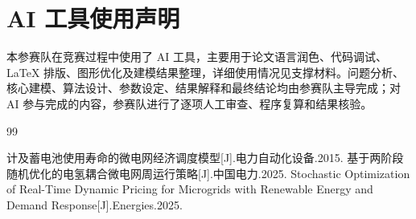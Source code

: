 %
%

\section*{AI 工具使用声明}

本参赛队在竞赛过程中使用了 AI 工具，主要用于论文语言润色、代码调试、\LaTeX{} 排版、图形优化及建模结果整理，详细使用情况见支撑材料。问题分析、核心建模、算法设计、参数设定、结果解释和最终结论均由参赛队主导完成；对 AI 参与完成的内容，参赛队进行了逐项人工审查、程序复算和结果核验。

\vspace{0.5\baselineskip}
\begin{thebibliography}{99}

计及蓄电池使用寿命的微电网经济调度模型[J].电力自动化设备.2015.
基于两阶段随机优化的电氢耦合微电网周运行策略[J].中国电力.2025.
Stochastic Optimization of Real-Time Dynamic Pricing for Microgrids with Renewable Energy and Demand Response[J].Energies.2025.


\end{thebibliography}
